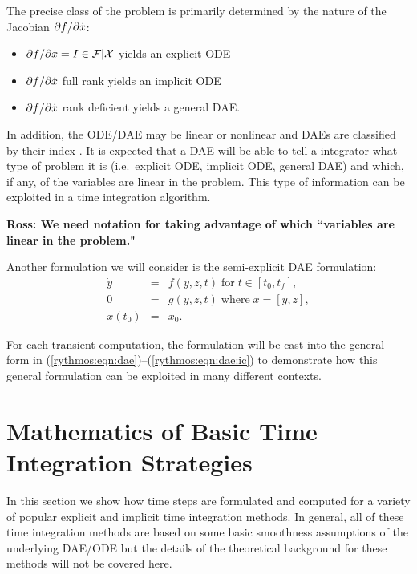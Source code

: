 \documentclass[pdf,ps2pdf,11pt]{SANDreport}
\begin{document}
The precise class of the problem is primarily determined by the nature of the
Jacobian $\partial f / \partial \dot{x}$:
%
\begin{itemize}
%
{}\item $\partial f / \partial \dot{x} = I {}\in {}\mathcal{F}|\mathcal{X}$ yields an explicit ODE
%
{}\item $\partial f / \partial \dot{x}$ full rank yields an implicit ODE
%
{}\item $\partial f / \partial \dot{x}$ rank deficient yields a general
DAE.
\end{itemize}
%
In addition, the ODE/DAE may be linear or nonlinear and DAEs are classified by
their index \cite{BCP}.  It is expected that a DAE will be able to tell a 
integrator what type of problem it is (i.e.\ explicit ODE, implicit ODE,
general DAE) and which, if any, of the variables are linear in the problem.
This type of information can be exploited in a time integration algorithm.

{}\textbf{Ross: We need notation for taking advantage of which ``variables are
linear in the problem."}

Another formulation we will consider is the semi-explicit DAE formulation:
\begin{equation}
\label{rythmos:eqn:dae:semiexplicit} 
\begin{array}{rcl}
\dot{y} & = & f(y,z,t) \; \mbox{for} \; t \in [t_0, t_f], \\
0       & = & g(y,z,t) \; \mbox{where} \; x = [y, z], \\
x(t_0)  & = & x_0.
\end{array}
\end{equation}

For each transient computation, the formulation will be cast into the general
form in (\ref{rythmos:eqn:dae})--(\ref{rythmos:eqn:dae:ic}) to demonstrate how
this general formulation can be exploited in many different contexts.

\section{Mathematics of Basic Time Integration Strategies}

In this section we show how time steps are formulated and computed for a
variety of popular explicit and implicit time integration methods.  In general,
all of these time integration methods are based on some basic smoothness
assumptions of the underlying DAE/ODE but the details of the theoretical
background for these methods will not be covered here.
\end{document}
